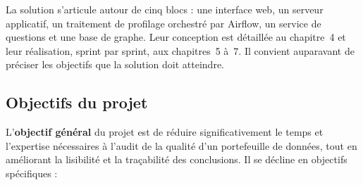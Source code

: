 
La solution s'articule autour de cinq blocs : une interface web, un serveur applicatif, un traitement de profilage orchestré par Airflow, un service de questions et une base de graphe. Leur conception est détaillée au chapitre~4 et leur réalisation, sprint par sprint, aux chapitres~5 à~7. Il convient auparavant de préciser les objectifs que la solution doit atteindre.

\subsection{Objectifs du projet}

L'\textbf{objectif général} du projet est de réduire significativement le temps et l'expertise nécessaires à l'audit de la qualité d'un portefeuille de données, tout en améliorant la lisibilité et la traçabilité des conclusions. Il se décline en objectifs spécifiques :

